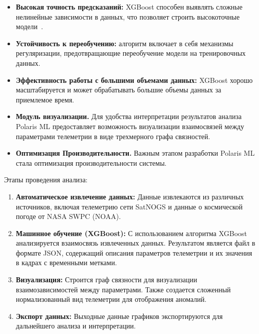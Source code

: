 \documentclass[14pt, a4paper]{extreport}
\begin{document}
    \begin{itemize}
        \item \textbf{Высокая точность предсказаний:} XGBoost способен выявлять сложные нелинейные зависимости в данных, что позволяет строить высокоточные модели~\cite{behaviour_based_anomaly_detection}.
        \item \textbf{Устойчивость к переобучению:} алгоритм включает в себя механизмы регуляризации, предотвращающие переобучение модели на тренировочных данных.
        \item \textbf{Эффективность работы с большими объемами данных:} XGBoost хорошо масштабируется и может обрабатывать большие объемы данных за приемлемое время.
        \item \textbf{Модуль визуализации.} Для удобства интерпретации результатов анализа Polaris ML предоставляет возможность визуализации взаимосвязей между параметрами телеметрии в виде трехмерного графа связностей.
        \item \textbf{Оптимизация Производительности.} Важным этапом разработки Polaris ML стала оптимизация производительности системы.
    \end{itemize}

    Этапы проведения анализа:

    \begin{enumerate}[label=\arabic*.]
        \item \textbf{Автоматическое извлечение данных:}
        Данные извлекаются из различных источников, включая телеметрию сети SatNOGS и данные о космической погоде от NASA SWPC (NOAA).

        \item \textbf{Машинное обучение (XGBoost):}
        С использованием алгоритма XGBoost~\cite{xgboost_docs,boumghar_2018_enhanced} анализируется взаимосвязь извлеченных данных.
        Результатом является файл в формате JSON, содержащий описания параметров телеметрии и их значения в кадрах с временными метками.

        \item \textbf{Визуализация:}
        Строится граф связности для визуализации взаимозависимостей между параметрами.
        Также создается сложенный нормализованный вид телеметрии для отображения аномалий.

        \item \textbf{Экспорт данных:}
        Выходные данные графиков экспортируются для дальнейшего анализа и интерпретации.
    \end{enumerate}
\end{document}
